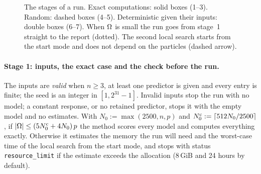 \begin{figure}[ht]
\centering
{}
\caption{The stages of a run. Exact computations: solid boxes (1--3). Random: dashed boxes (4--5). Deterministic given
their inputs: double boxes (6--7). When $\Omega$ is small the run goes from stage~1 straight to the report (dotted). The
second local search starts from the start mode and does not depend on the particles (dashed arrow).}
\label{fig:pipeline}
\end{figure}

\paragraph{Stage 1: inputs, the exact case and the check before the run.} The inputs are \emph{valid} when $n\ge3$, at
least one predictor is given and every entry is finite; the seed is an integer in $[1,2^{31}-1]$. Invalid inputs stop the
run with no model; a constant response, or no retained predictor, stops it with the empty model and no estimates. With $N_0:=\max(2500,n,p)$ and $N^{\mathrm c}_0:=\lceil512N_0/2500\rceil$, if $\lvert \Omega\rvert\le(5N^{\mathrm c}_0+4N_0)\,p$ the method scores every model
and computes everything exactly. Otherwise it estimates the memory the run will need and the worst-case time of the local search from the start
mode, and stops with status \texttt{resource\_limit} if the
estimate exceeds the allocation (8\,GiB and 24 hours by default).

